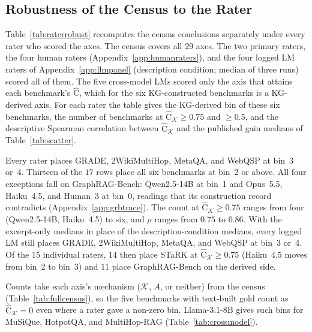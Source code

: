 \documentclass[11pt]{article}
\newcommand{\Chat}{\widehat{\mathrm{C}}}
\newcommand{\kg}{\mathcal{K}}
\begin{document}
\subsection{Robustness of the Census to the Rater}
\label{app:raterrobust}
Table~\ref{tab:raterrobust} recomputes the census conclusions separately under every rater who scored the axes. The census covers all $29$ axes. The two primary raters, the four human raters (Appendix~\ref{app:humanraters}), and the four logged LM raters of Appendix~\ref{app:llmpanel} (description condition; median of three runs) scored all of them. The five cross-model LMs scored only the axis that attains each benchmark's $\Chat$, which for the six KG-constructed benchmarks is a KG-derived axis. For each rater the table gives the KG-derived bin of these six benchmarks, the number of benchmarks at $\Chat_{\kg}\geq0.75$ and $\geq0.5$, and the descriptive Spearman correlation between $\Chat_{\kg}$ and the published gain medians of Table~\ref{tab:scatter}.

Every rater places GRADE, 2WikiMultiHop, MetaQA, and WebQSP at bin~3 or~4. Thirteen of the $17$ rows place all six benchmarks at bin~2 or above. All four exceptions fall on GraphRAG-Bench: Qwen2.5-14B at bin~1 and Opus~5.5, Haiku~4.5, and Human~3 at bin~0, readings that its construction record contradicts (Appendix~\ref{app:grbtrace}). The count at $\Chat_{\kg}\geq0.75$ ranges from four (Qwen2.5-14B, Haiku~4.5) to six, and $\rho$ ranges from $0.75$ to $0.86$. With the excerpt-only medians in place of the description-condition medians, every logged LM still places GRADE, 2WikiMultiHop, MetaQA, and WebQSP at bin~3 or~4. Of the $15$ individual raters, $14$ then place STaRK at $\Chat_{\kg}\geq0.75$ (Haiku~4.5 moves from bin~2 to bin~3) and $11$ place GraphRAG-Bench on the derived side.

Counts take each axis's mechanism ($\kg$, $A$, or neither) from the census (Table~\ref{tab:fullcensus}), so the five benchmarks with text-built gold count as $\Chat_{\kg}=0$ even where a rater gave a non-zero bin. Llama-3.1-8B gives such bins for MuSiQue, HotpotQA, and MultiHop-RAG (Table~\ref{tab:crossmodel}).
\end{document}

